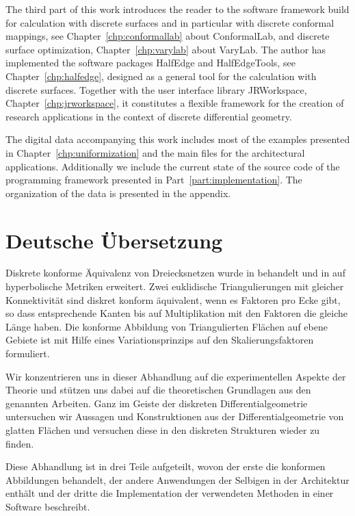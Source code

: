 \documentclass[Thesis.tex]{subfiles}
\begin{document}
The third part of this work introduces the reader to the software framework build for calculation with discrete surfaces and in particular with discrete conformal mappings, see Chapter~\ref{chp:conformallab}  about {\sc ConformalLab}, and discrete surface optimization, Chapter~\ref{chp:varylab} about {\sc VaryLab}. The author has implemented the software packages {\sc HalfEdge} and {\sc HalfEdgeTools}, see Chapter~\ref{chp:halfedge}, designed as a general tool for the calculation with discrete surfaces. Together with the user interface library {\sc JRWorkspace}, Chapter~\ref{chp:jrworkspace}, it constitutes a flexible framework for the creation of research applications in the context of discrete differential geometry. 

The digital data accompanying this work includes most of the examples presented in Chapter~\ref{chp:uniformization} and the main files for the architectural applications. Additionally we include the current state of the source code of the programming framework presented in Part~\ref{part:implementation}. The organization of the data is presented in the appendix.

\section*{Deutsche \"{U}bersetzung}
Diskrete konforme \"{A}quivalenz von Dreiecksnetzen wurde in \cite{Springborn2008} behandelt und in \cite{Bobenko2010} auf hyperbolische Metriken erweitert.
Zwei euklidische Triangulierungen mit gleicher Konnektivit\"{a}t sind diskret konform \"{a}quivalent, wenn es  Faktoren pro Ecke gibt, so dass entsprechende Kanten bis auf Multiplikation mit den Faktoren die gleiche L\"{a}nge haben.
Die konforme Abbildung von Triangulierten Fl\"{a}chen auf ebene Gebiete ist mit Hilfe eines Variationsprinzips auf den Skalierungsfaktoren formuliert.

Wir konzentrieren uns in dieser Abhandlung auf die experimentellen Aspekte der Theorie und st\"{u}tzen uns dabei auf die theoretischen Grundlagen aus den genannten Arbeiten.
Ganz im Geiste der diskreten Differentialgeometrie untersuchen wir Aussagen und Konstruktionen aus der Differentialgeometrie von glatten Fl\"{a}chen und versuchen diese in den diskreten Strukturen wieder zu finden.

Diese Abhandlung ist in drei Teile aufgeteilt, wovon der erste die konformen Abbildungen behandelt, der andere Anwendungen der Selbigen in der Architektur enth\"{a}lt und der dritte die Implementation der verwendeten Methoden in einer Software beschreibt.
\end{document}
